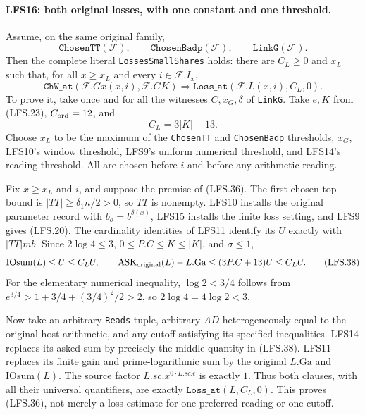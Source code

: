 \paragraph{LFS16: both original losses, with one constant and one threshold.}
\label{claim:LFS16}
Assume, on the same original family,
\[
 \texttt{ChosenTT}(\mathcal F),\qquad
 \texttt{ChosenBadp}(\mathcal F),\qquad
 \texttt{LinkG}(\mathcal F).                              \tag{LFS.35}
\]
Then the complete literal \texttt{LossesSmallShares} holds:
there are $C_L\ge0$ and $x_L$ such that, for all $x\ge x_L$
and every $i\in\mathcal F.I_x$,
\[
 \texttt{ChW\_at}(\mathcal F.Gx(x,i),\mathcal F.GK)
       \Longrightarrow\texttt{Loss\_at}(\mathcal F.L(x,i),C_L,0).
                                                               \tag{LFS.36}
\]
To prove it, take once and for all the witnesses
$C,x_G,\delta$ of \texttt{LinkG}.
Take $e,K$ from (LFS.23), $C_{\rm ord}=12$, and
\[
                              C_L=3|K|+13.                   \tag{LFS.37}
\]
Choose $x_L$ to be the maximum of the \texttt{ChosenTT} and
\texttt{ChosenBadp} thresholds, $x_G$, LFS10's window
threshold, LFS9's uniform numerical threshold, and LFS14's
reading threshold.  All are chosen before $i$ and before
any arithmetic reading.

Fix $x\ge x_L$ and $i$, and suppose the premise of (LFS.36).
The first chosen-top bound is
$|TT|\ge\delta_1 n/2>0$, so $TT$ is nonempty.
LFS10 installs the original parameter record with
$b_o=b^{\delta(x)}$, LFS15 installs the finite loss setting,
and LFS9 gives (LFS.20).  The cardinality identities of
LFS11 identify its $U$ exactly with $|TT|mb$.
Since $2\log4\le3$, $0\le P.C\le K\le|K|$, and
$\sigma\le1$,
\[
 \mathrm{IOsum}(L)\le U\le C_LU,
 \qquad\mathrm{ASK}_{\rm original}(L)-L.\mathrm{Ga}
                  \le(3P.C+13)U\le C_LU.                 \tag{LFS.38}
\]
For the elementary numerical inequality, $\log2<3/4$
follows from $e^{3/4}>1+3/4+(3/4)^2/2>2$, so
$2\log4=4\log2<3$.

Now take an arbitrary \texttt{Reads} tuple, arbitrary
$AD$ heterogeneously equal to the original host arithmetic,
and any cutoff satisfying its specified inequalities.
LFS14 replaces its asked sum by precisely the middle
quantity in (LFS.38).  LFS11 replaces its finite gain and
prime-logarithmic sum by the original $L.\mathrm{Ga}$ and
$\mathrm{IOsum}(L)$.  The source factor
$L.sc.x^{0\cdot L.sc.\epsilon}$ is exactly $1$.
Thus both clauses, with all their universal quantifiers,
are exactly $\texttt{Loss\_at}(L,C_L,0)$.
This proves (LFS.36), not merely a loss estimate for one
preferred reading or one cutoff.

